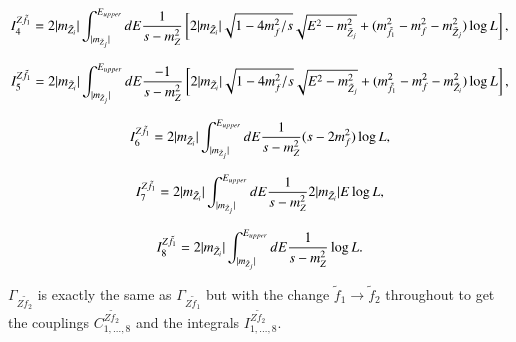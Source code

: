 \documentclass[final,3p,times,pdflatex]{elsarticle}
\begin{document}
\begin{equation}
I_{4}^{Z \tilde{f}_1} = 2|m_{\tilde{Z}_i}|\int_{|m_{\tilde{Z}_j}|}^{E_{upper}} dE {1 \over s-m_{Z}^2}
\left[2|m_{\tilde{Z}_i}|\sqrt{1-4m_{f}^2/s}\sqrt{E^2 - m_{\tilde{Z}_j}^2} + (m_{\tilde{f}_1}^2 - m_{f}^2 -m_{\tilde{Z}_j}^2) \log L\right],
\end{equation}

\begin{equation}
I_{5}^{Z \tilde{f}_1} = 2|m_{\tilde{Z}_i}|\int_{|m_{\tilde{Z}_j}|}^{E_{upper}} dE {-1 \over s-m_{Z}^2}
\left[2|m_{\tilde{Z}_i}|\sqrt{1-4m_{f}^2/s}\sqrt{E^2 - m_{\tilde{Z}_j}^2} + (m_{\tilde{f}_1}^2 - m_{f}^2 -m_{\tilde{Z}_i}^2) \log L\right],
\end{equation}

\begin{equation}
I_{6}^{Z \tilde{f}_1} = 2|m_{\tilde{Z}_i}|\int_{|m_{\tilde{Z}_j}|}^{E_{upper}} dE {1 \over s-m_{Z}^2}(s - 2m_{f}^2)\log L,
\end{equation}

\begin{equation}
I_{7}^{Z \tilde{f}_1} = 2|m_{\tilde{Z}_i}|\int_{|m_{\tilde{Z}_j}|}^{E_{upper}} dE {1 \over s-m_{Z}^2} 2|m_{\tilde{Z}_i}| E \log L,
\end{equation}

\begin{equation}
I_{8}^{Z \tilde{f}_1} = 2|m_{\tilde{Z}_i}|\int_{|m_{\tilde{Z}_j}|}^{E_{upper}} dE {1 \over s-m_{Z}^2} \log L.
\end{equation}

$\Gamma_{Z \tilde{f}_2}$ is exactly the same as $\Gamma_{Z \tilde{f}_1}$ but with the change $\tilde{f}_1 \rightarrow \tilde{f}_2$ throughout to get the couplings $C_{1,\ldots,8}^{Z \tilde{f}_2}$ and the integrals $I_{1,\ldots,8}^{Z \tilde{f}_2}$.
\end{document}
